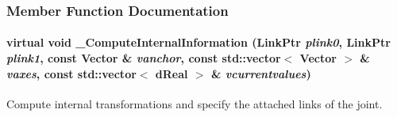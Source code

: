 \subsubsection{Member Function Documentation}
\hypertarget{classOpenRAVE_1_1KinBody_1_1Joint_a44e669248f1eb1fe09308bf98bd2d292}{
\paragraph[{\_\-ComputeInternalInformation}]{\setlength{\rightskip}{0pt plus 5cm}virtual void \_\-ComputeInternalInformation (LinkPtr {\em plink0}, \/  LinkPtr {\em plink1}, \/  const Vector \& {\em vanchor}, \/  const std::vector$<$ Vector $>$ \& {\em vaxes}, \/  const std::vector$<$ dReal $>$ \& {\em vcurrentvalues})}\hfill}
\label{classOpenRAVE_1_1KinBody_1_1Joint_a44e669248f1eb1fe09308bf98bd2d292}


Compute internal transformations and specify the attached links of the joint. 

